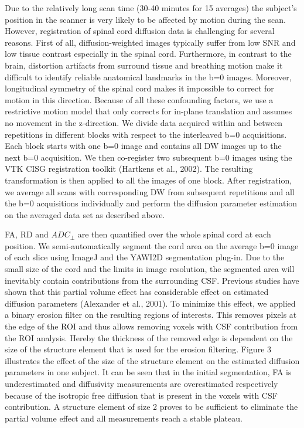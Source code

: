 Due to the relatively long scan time (30-40 minutes for 15 averages) the subject’s position in the scanner is very likely to be affected by motion during the scan. However, registration of spinal cord diffusion data is challenging for several reasons. First of all, diffusion-weighted images typically suffer from low SNR and low tissue contrast especially in the spinal cord. Furthermore, in contrast to the brain, distortion artifacts from surround tissue and breathing motion make it difficult to identify reliable anatomical landmarks in the b=0 images. Moreover, longitudinal symmetry of the spinal cord makes it impossible to correct for motion in this direction. Because of all these confounding factors, we use a restrictive motion model that only corrects for in-plane translation and assumes no movement in the z-direction. We divide data acquired within and between repetitions in different blocks with respect to the interleaved b=0 acquisitions. Each block starts with one b=0 image and contains all DW images up to the next b=0 acquisition. We then co-register two subsequent b=0 images using the VTK CISG registration toolkit (Hartkens et al., 2002). The resulting transformation is then applied to all the images of one block. After registration, we average all scans with corresponding DW from subsequent repetitions and all the b=0 acquisitions individually and perform the diffusion parameter estimation on the averaged data set as described above.

FA, RD and $ADC_\perp$ are then quantified over the whole spinal cord at each position. We semi-automatically segment the cord area on the average b=0 image of each slice using ImageJ and the YAWI2D segmentation plug-in. Due to the small size of the cord and the limits in image resolution, the segmented area will inevitably contain contributions from the surrounding CSF. Previous studies have shown that this partial volume effect has considerable effect on estimated diffusion parameters (Alexander et al., 2001). To minimize this effect, we applied a binary erosion filter on the resulting regions of interests. This removes pixels at the edge of the ROI and thus allows removing voxels with CSF contribution from the ROI analysis. Hereby the thickness of the removed edge is dependent on the size of the structure element that is used for the erosion filtering. Figure 3 illustrates the effect of the size of the structure element on the estimated diffusion parameters in one subject. It can be seen that in the initial segmentation, FA is underestimated and diffusivity measurements are overestimated respectively because of the isotropic free diffusion that is present in the voxels with CSF contribution. A structure element of size 2 proves to be sufficient to eliminate the partial volume effect and all measurements reach a stable plateau.

